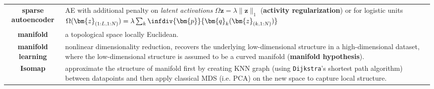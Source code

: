 \begin{table}[htpb]
{\begin{tabular}{cp{32em}}
        \textbf{sparse autoencoder} & AE with additional penalty on \textit{latent activations} $\Omega{\bm{z}}=\lambda\|\bm{z}\|_1$ (\textbf{activity regularization}) or for logistic units $\Omega(\bm{z}_{(1:L,1:N)})=\lambda\sum_k\infdiv{\bm{p}}{\bm{q}_k(\bm{z}_{(k,1:N)})}$ \\
        \textbf{manifold} & a topological space locally Euclidean.\\
        \textbf{manifold learning} & nonlinear dimensionality reduction, recovers the underlying low-dimensional structure in a high-dimensional dataset, where the low-dimensional structure is assumed to be a curved manifold (\textbf{manifold hypothesis}). \\
        \textbf{Isomap} & approximate the structure of manifold first by creating KNN graph 
        (using \texttt{Dijkstra}'s shortest path algorithm) between datapoints and 
        then apply classical MDS (i.e. PCA) on the new space to capture local structure. \\
        \bottomrule
    \end{tabular}}
    \label{tab:dimreduce}
\end{table}


